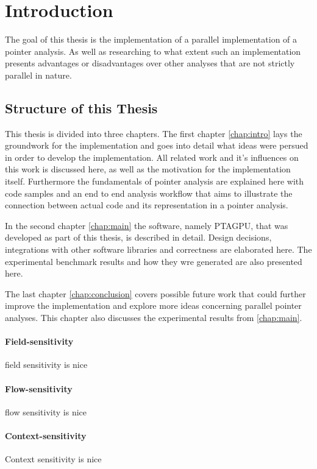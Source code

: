 \chapter{Introduction} \label{chap:intro}
The goal of this thesis is the implementation of a parallel implementation of a pointer analysis. As well as researching to what extent such an implementation presents advantages or disadvantages over other analyses that are not strictly parallel in nature.

\section{Structure of this Thesis}
This thesis is divided into three chapters.
The first chapter \autoref{chap:intro} lays the groundwork for the implementation and goes into detail what ideas were persued in order to develop the implementation. All related work and it's influences on this work is discussed here, as well as the motivation for the implementation itself. Furthermore the fundamentals of pointer analysis are explained here with code samples and an end to end analysis workflow that aims to illustrate the connection between actual code and its representation in a pointer analysis.

In the second chapter \autoref{chap:main} the software, namely PTAGPU, that was developed as part of this thesis, is described in detail. Design decisions, integrations with other software libraries and correctness are elaborated here.
The experimental benchmark results and how they wre generated are also presented here.

The last chapter \autoref{chap:conclusion} covers possible future work that could further improve the implementation and explore more ideas concerning parallel pointer analyses.
This chapter also discusses the experimental results from \autoref{chap:main}.


\subsubsection{Field-sensitivity}
field sensitivity is nice
\subsubsection{Flow-sensitivity}
flow sensitivity is nice
\subsubsection{Context-sensitivity}
Context sensitivity is nice
